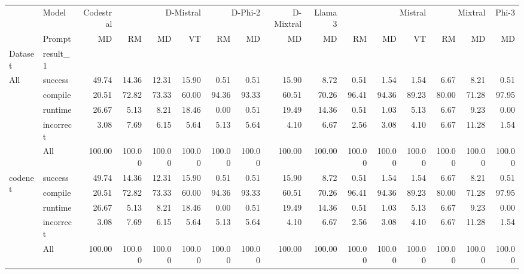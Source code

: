 \begin{tabular}{llrrrrrrrrrrrrrr}
\toprule
 & Model & Codestral & \multicolumn{3}{r}{D-Mistral} & \multicolumn{2}{r}{D-Phi-2} & D-Mixtral & Llama 3 & \multicolumn{3}{r}{Mistral} & \multicolumn{2}{r}{Mixtral} & Phi-3 \\
 & Prompt & MD & RM & MD & VT & RM & MD & MD & MD & RM & MD & VT & RM & MD & MD \\
Dataset & result_1 &  &  &  &  &  &  &  &  &  &  &  &  &  &  \\
\midrule
\multirow[t]{5}{*}{All} & success & 49.74 & 14.36 & 12.31 & 15.90 & 0.51 & 0.51 & 15.90 & 8.72 & 0.51 & 1.54 & 1.54 & 6.67 & 8.21 & 0.51 \\
 & compile & 20.51 & 72.82 & 73.33 & 60.00 & 94.36 & 93.33 & 60.51 & 70.26 & 96.41 & 94.36 & 89.23 & 80.00 & 71.28 & 97.95 \\
 & runtime & 26.67 & 5.13 & 8.21 & 18.46 & 0.00 & 0.51 & 19.49 & 14.36 & 0.51 & 1.03 & 5.13 & 6.67 & 9.23 & 0.00 \\
 & incorrect & 3.08 & 7.69 & 6.15 & 5.64 & 5.13 & 5.64 & 4.10 & 6.67 & 2.56 & 3.08 & 4.10 & 6.67 & 11.28 & 1.54 \\
 & All & 100.00 & 100.00 & 100.00 & 100.00 & 100.00 & 100.00 & 100.00 & 100.00 & 100.00 & 100.00 & 100.00 & 100.00 & 100.00 & 100.00 \\
\cline{1-16}
\multirow[t]{5}{*}{codenet} & success & 49.74 & 14.36 & 12.31 & 15.90 & 0.51 & 0.51 & 15.90 & 8.72 & 0.51 & 1.54 & 1.54 & 6.67 & 8.21 & 0.51 \\
 & compile & 20.51 & 72.82 & 73.33 & 60.00 & 94.36 & 93.33 & 60.51 & 70.26 & 96.41 & 94.36 & 89.23 & 80.00 & 71.28 & 97.95 \\
 & runtime & 26.67 & 5.13 & 8.21 & 18.46 & 0.00 & 0.51 & 19.49 & 14.36 & 0.51 & 1.03 & 5.13 & 6.67 & 9.23 & 0.00 \\
 & incorrect & 3.08 & 7.69 & 6.15 & 5.64 & 5.13 & 5.64 & 4.10 & 6.67 & 2.56 & 3.08 & 4.10 & 6.67 & 11.28 & 1.54 \\
 & All & 100.00 & 100.00 & 100.00 & 100.00 & 100.00 & 100.00 & 100.00 & 100.00 & 100.00 & 100.00 & 100.00 & 100.00 & 100.00 & 100.00 \\
\cline{1-16}
\bottomrule
\end{tabular}
